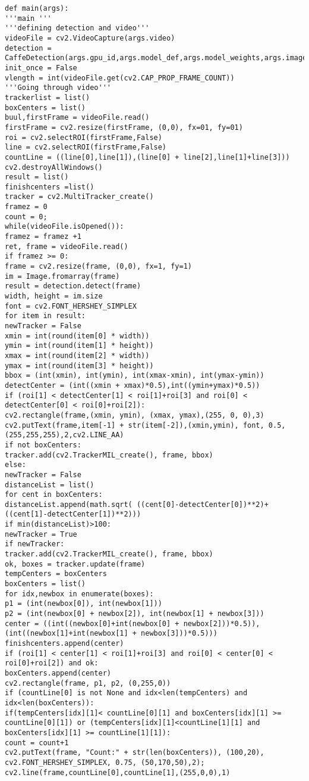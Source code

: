 \documentclass[12pt,paper=a4]{report}
\begin{document}
\begin{lstlisting}
def main(args):
'''main '''
'''defining detection and video'''
videoFile = cv2.VideoCapture(args.video)
detection = CaffeDetection(args.gpu_id,args.model_def,args.model_weights,args.image_resize,args.labelmap_file)
init_once = False
vlength = int(videoFile.get(cv2.CAP_PROP_FRAME_COUNT))    
'''Going through video'''
trackerlist = list()
boxCenters = list()
buul,firstFrame = videoFile.read()
firstFrame = cv2.resize(firstFrame, (0,0), fx=01, fy=01)
roi = cv2.selectROI(firstFrame,False)
line = cv2.selectROI(firstFrame,False)
countLine = ((line[0],line[1]),(line[0] + line[2],line[1]+line[3]))
cv2.destroyAllWindows() 
result = list()
finishcenters =list()
tracker = cv2.MultiTracker_create()  
framez = 0 
count = 0;
while(videoFile.isOpened()):  
framez = framez +1
ret, frame = videoFile.read()
if framez >= 0:
frame = cv2.resize(frame, (0,0), fx=1, fy=1)        
im = Image.fromarray(frame)      
result = detection.detect(frame)        
width, height = im.size
font = cv2.FONT_HERSHEY_SIMPLEX  
for item in result:
newTracker = False              
xmin = int(round(item[0] * width))
ymin = int(round(item[1] * height))
xmax = int(round(item[2] * width))
ymax = int(round(item[3] * height))
bbox = (int(xmin), int(ymin), int(xmax-xmin), int(ymax-ymin))
detectCenter = (int((xmin + xmax)*0.5),int((ymin+ymax)*0.5))   
if (roi[1] < detectCenter[1] < roi[1]+roi[3] and roi[0] < detectCenter[0] < roi[0]+roi[2]):
cv2.rectangle(frame,(xmin, ymin), (xmax, ymax),(255, 0, 0),3)            
cv2.putText(frame,item[-1] + str(item[-2]),(xmin,ymin), font, 0.5,(255,255,255),2,cv2.LINE_AA)                   
if not boxCenters:
tracker.add(cv2.TrackerMIL_create(), frame, bbox)
else:
newTracker = False
distanceList = list()
for cent in boxCenters:
distanceList.append(math.sqrt( ((cent[0]-detectCenter[0])**2)+((cent[1]-detectCenter[1])**2)))
if min(distanceList)>100:
newTracker = True
if newTracker:
tracker.add(cv2.TrackerMIL_create(), frame, bbox)
ok, boxes = tracker.update(frame)
tempCenters = boxCenters
boxCenters = list()
for idx,newbox in enumerate(boxes):            
p1 = (int(newbox[0]), int(newbox[1]))
p2 = (int(newbox[0] + newbox[2]), int(newbox[1] + newbox[3]))
center = ((int((newbox[0]+int(newbox[0] + newbox[2]))*0.5)),(int((newbox[1]+int(newbox[1] + newbox[3]))*0.5)))
finishcenters.append(center)
if (roi[1] < center[1] < roi[1]+roi[3] and roi[0] < center[0] < roi[0]+roi[2]) and ok:
boxCenters.append(center)
cv2.rectangle(frame, p1, p2, (0,255,0))
if (countLine[0] is not None and idx<len(tempCenters) and idx<len(boxCenters)):
if(tempCenters[idx][1]< countLine[0][1] and boxCenters[idx][1] >= countLine[0][1]) or (tempCenters[idx][1]<countLine[1][1] and boxCenters[idx][1] >= countLine[1][1]):
count = count+1
cv2.putText(frame, "Count:" + str(len(boxCenters)), (100,20), cv2.FONT_HERSHEY_SIMPLEX, 0.75, (50,170,50),2); 
cv2.line(frame,countLine[0],countLine[1],(255,0,0),1)


\end{lstlisting}
\end{document}
